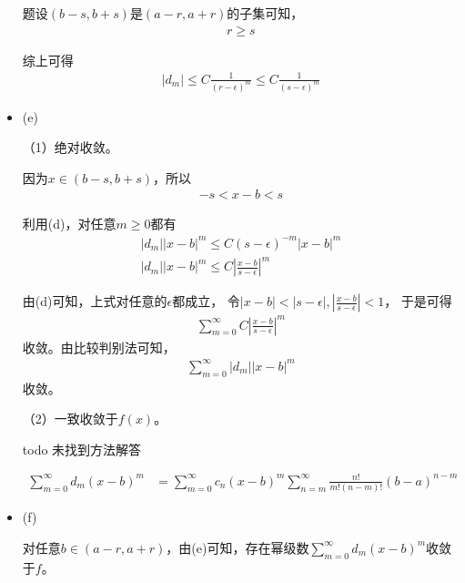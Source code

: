 \documentclass{article}
\begin{document}
\begin{itemize}
        题设$(b - s, b + s)$是$(a - r, a + r)$的子集可知，
        \begin{align*}
          r \geq s
        \end{align*}

        综上可得
        \begin{align*}
          |d_m| \leq C \frac{1}{(r - \epsilon)^{m}} \leq C \frac{1}{(s - \epsilon)^{m}}
        \end{align*}

  \item (e)

        （1）绝对收敛。

        因为$x \in (b - s, b + s)$，所以
        \begin{align*}
          -s < x - b < s
        \end{align*}

        利用(d)，对任意$m \geq 0$都有
        \begin{align*}
          |d_m||x - b|^m \leq C(s - \epsilon)^{-m} |x - b|^m \\
          |d_m||x - b|^m \leq C \left|\frac{x - b}{s - \epsilon}\right|^m
        \end{align*}

        由(d)可知，上式对任意的$\epsilon$都成立，
        令$|x - b| < |s - \epsilon|, \left|\frac{x - b}{s - \epsilon}\right| < 1$，
        于是可得
        \begin{align*}
          \sum \limits_{m = 0}^\infty C \left|\frac{x - b}{s - \epsilon}\right|^m
        \end{align*}
        收敛。由比较判别法可知，
        \begin{align*}
          \sum \limits_{m = 0}^\infty |d_m||x - b|^m
        \end{align*}
        收敛。

        （2）一致收敛于$f(x)$。

        todo 未找到方法解答

        \begin{align*}
          \sum \limits_{m = 0}^\infty d_m (x - b)^m
           & = \sum \limits_{m = 0}^\infty  c_n(x - b)^m \sum \limits_{n = m}^\infty \frac{n!}{m!(n - m)!}(b - a)^{n - m}
        \end{align*}

  \item (f)

        对任意$b \in (a -r, a + r)$，由(e)可知，存在幂级数$\sum\limits_{m = 0}^\infty d_m (x - b)^m$收敛于$f$。

\end{itemize}
\end{document}
